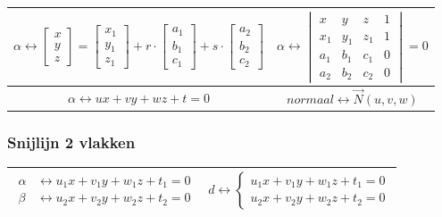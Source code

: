 \documentclass[a5paper]{article}
\begin{document}
\begin{table}[h!]
\centering
\begin{tabular}{|c|c|}
\hline
{\small $
\alpha \leftrightarrow
\begin{bmatrix}
x \\[3pt]
y \\[3pt]
z
\end{bmatrix}
=
\begin{bmatrix}
x_1 \\[3pt]
y_1 \\[3pt]
z_1
\end{bmatrix}
+ r \cdot
\begin{bmatrix}
a_1 \\[3pt]
b_1 \\[3pt]
c_1
\end{bmatrix}
+ s \cdot
\begin{bmatrix}
a_2 \\[3pt]
b_2 \\[3pt]
c_2
\end{bmatrix}
$}
&
$
\alpha \leftrightarrow
\begin{vmatrix}
x & y & z & 1 \\[3pt]
x_1 & y_1 & z_1 & 1 \\[3pt]
a_1 & b_1 & c_1 & 0 \\[3pt]
a_2 & b_2 & c_2 & 0
\end{vmatrix}
= 0
$ \\
\hline
$\alpha \leftrightarrow ux+vy+wz+t = 0 $ & $normaal \leftrightarrow \vec{N}(u, v, w)$ \\
\hline
\end{tabular}
\end{table}

\subsubsection{Snijlijn 2 vlakken}

\begin{table}[h!]
\centering
\begin{tabular}{|c|c|}
\hline
$
\begin{aligned}
\alpha &\leftrightarrow u_1x + v_1y + w_1z + t_1 = 0 \\
\beta  &\leftrightarrow u_2x + v_2y + w_2z + t_2 = 0
\end{aligned}
$
&
$
d \leftrightarrow 
\begin{cases}
u_1x + v_1y + w_1z + t_1 = 0 \\
u_2x + v_2y + w_2z + t_2 = 0
\end{cases}
$ \\
\hline
\end{tabular}
\end{table}
\end{document}
